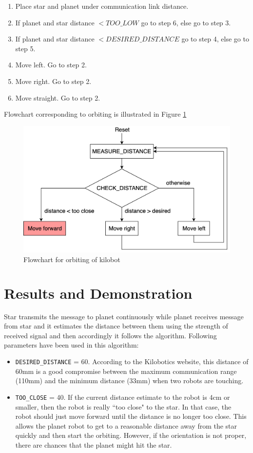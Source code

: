 \begin{enumerate}
    \item Place star and planet under communication link distance.
    \item If planet and star distance $<TOO\_LOW$ go to step 6, else go to step 3.
    \item If planet and star distance $<DESIRED\_DISTANCE$ go to step 4, else go to step 5.
    \item Move left. Go to step 2.
    \item Move right. Go to step 2.
    \item Move straight. Go to step 2.
\end{enumerate}
Flowchart corresponding to orbiting is illustrated in Figure \ref{fig:orbit_flowchart}

\begin{figure}[H]
    \centering
    \includegraphics[scale=0.6]{images/orbiting}
    \caption{Flowchart for orbiting of kilobot}
    \label{fig:orbit_flowchart}
\end{figure}
\section{Results and Demonstration}
Star transmits the message to planet continuously while planet receives message from star and it estimates the distance between them using the strength of received signal and then accordingly it follows the algorithm. Following parameters have been used in this algorithm: 
\begin{itemize}
\item \texttt{DESIRED\_DISTANCE} = 60. According to the Kilobotics website, this distance of 60mm is a good compromise between the maximum communication range (110mm) and the minimum distance (33mm) when two robots are touching.
\item \texttt{TOO\_CLOSE} = 40. If the current distance estimate to the robot is 4cm or smaller, then the robot is really ``too close" to the star. In that case, the robot should just move forward until the distance is no longer too close. This allows the planet robot to get to a reasonable distance away from the star quickly and then start the orbiting. However, if the orientation is not proper, there are chances that the planet might hit the star.  
\end{itemize}

